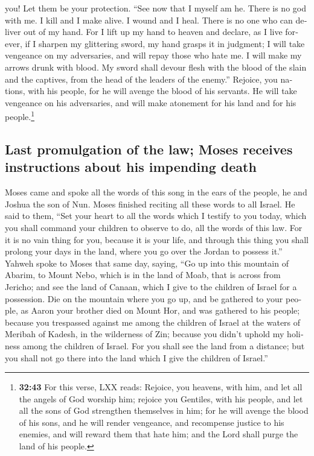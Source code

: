 \begin{paracol}{2}
\begin{otherlanguage}{english}
you! Let them be your protection.  ``See now that I
myself am he. There is no god with me. I kill and I make alive. I wound
and I heal. There is no one who can deliver out of my hand.
 For I lift up my hand to heaven and declare, as I live
forever,  if I sharpen my glittering sword, my hand
grasps it in judgment; I will take vengeance on my adversaries, and will
repay those who hate me.  I will make my arrows drunk
with blood. My sword shall devour flesh with the blood of the slain and
the captives, from the head of the leaders of the enemy.''
 Rejoice, you nations, with his people, for he will
avenge the blood of his servants. He will take vengeance on his
adversaries, and will make atonement for his land and for his
people.\footnote{\textbf{32:43} For this verse, LXX reads: Rejoice, you
  heavens, with him, and let all the angels of God worship him; rejoice
  you Gentiles, with his people, and let all the sons of God strengthen
  themselves in him; for he will avenge the blood of his sons, and he
  will render vengeance, and recompense justice to his enemies, and will
  reward them that hate him; and the Lord shall purge the land of his
  people.}

\hypertarget{last-promulgation-of-the-law-moses-receives-instructions-about-his-impending-death}{%
\subsection{Last promulgation of the law; Moses receives instructions
about his impending
death}\label{last-promulgation-of-the-law-moses-receives-instructions-about-his-impending-death}}

 Moses came and spoke all the words of this song in the
ears of the people, he and Joshua the son of Nun.  Moses
finished reciting all these words to all Israel.  He said
to them, ``Set your heart to all the words which I testify to you today,
which you shall command your children to observe to do, all the words of
this law.  For it is no vain thing for you, because it is
your life, and through this thing you shall prolong your days in the
land, where you go over the Jordan to possess it.'' 
Yahweh spoke to Moses that same day, saying,  ``Go up
into this mountain of Abarim, to Mount Nebo, which is in the land of
Moab, that is across from Jericho; and see the land of Canaan, which I
give to the children of Israel for a possession.  Die on
the mountain where you go up, and be gathered to your people, as Aaron
your brother died on Mount Hor, and was gathered to his people;
 because you trespassed against me among the children of
Israel at the waters of Meribah of Kadesh, in the wilderness of Zin;
because you didn't uphold my holiness among the children of Israel.
 For you shall see the land from a distance; but you
shall not go there into the land which I give the children of Israel.''


\end{otherlanguage}
\end{paracol}
